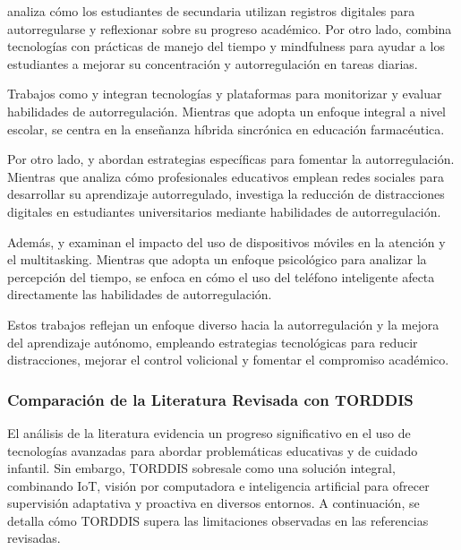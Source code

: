 \documentclass[a4paper,fleqn]{cas-sc}
\begin{document}
					\cite{Roberts2020Task} analiza cómo los estudiantes de secundaria utilizan registros digitales para autorregularse y reflexionar sobre su progreso académico. Por otro lado, \cite{Adcroft2018Developing} combina tecnologías con prácticas de manejo del tiempo y mindfulness para ayudar a los estudiantes a mejorar su concentración y autorregulación en tareas diarias.
					
					Trabajos como \cite{Salter2014Exploring} y \cite{Palmer2022impact} integran tecnologías y plataformas para monitorizar y evaluar habilidades de autorregulación. Mientras que \cite{Salter2014Exploring} adopta un enfoque integral a nivel escolar, \cite{Palmer2022impact} se centra en la enseñanza híbrida sincrónica en educación farmacéutica.
					
					Por otro lado, \cite{Muljana2022Instructional} y \cite{Wang2022Empowering} abordan estrategias específicas para fomentar la autorregulación. Mientras que \cite{Muljana2022Instructional} analiza cómo profesionales educativos emplean redes sociales para desarrollar su aprendizaje autorregulado, \cite{Wang2022Empowering} investiga la reducción de distracciones digitales en estudiantes universitarios mediante habilidades de autorregulación.
					
					Además, \cite{Hartley2022Smartphone} y \cite{Labar2019Interplay} examinan el impacto del uso de dispositivos móviles en la atención y el multitasking. Mientras que \cite{Labar2019Interplay} adopta un enfoque psicológico para analizar la percepción del tiempo, \cite{Hartley2022Smartphone} se enfoca en cómo el uso del teléfono inteligente afecta directamente las habilidades de autorregulación.
					
					Estos trabajos reflejan un enfoque diverso hacia la autorregulación y la mejora del aprendizaje autónomo, empleando estrategias tecnológicas para reducir distracciones, mejorar el control volicional y fomentar el compromiso académico.
			
				\subsubsection{Comparación de la Literatura Revisada con TORDDIS}
					El análisis de la literatura evidencia un progreso significativo en el uso de tecnologías avanzadas para abordar problemáticas educativas y de cuidado infantil. Sin embargo, TORDDIS sobresale como una solución integral, combinando IoT, visión por computadora e inteligencia artificial para ofrecer supervisión adaptativa y proactiva en diversos entornos. A continuación, se detalla cómo TORDDIS supera las limitaciones observadas en las referencias revisadas.
			
\end{document}
